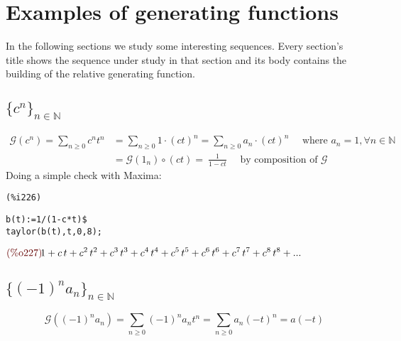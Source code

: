 
\section{Examples of generating functions}

In the following sections we study some interesting sequences. Every
section's title shows the sequence under study in that section and its
body contains the building of the relative generating function.

\subsection{$\{c^n\}_{n\in \mathbb{N} }$}
\begin{displaymath}
  \begin{split}
    \mathcal{G} (c^n) = \sum_{n \geq 0}{c^n t^n} &= \sum_{n \geq
      0}{1\cdot (ct)^n} = \sum_{n \geq 0}{a_n \cdot (ct)^n} \quad
    \text{ where } a_n = 1, \forall n \in \mathbb{N} \\
    &= \mathcal{G} (1_n) \circ (ct) = \ \frac{1}{1-ct} \quad \text{ by
    composition of } \mathcal{G} 
  \end{split}
\end{displaymath}
Doing a simple check with Maxima:

\noindent
\begin{minipage}[t]{8ex}{\color{red}\bf
\begin{verbatim}
(%i226) 
\end{verbatim}}
\end{minipage}
\begin{minipage}[t]{\textwidth}{\color{blue}
\begin{verbatim}
b(t):=1/(1-c*t)$
taylor(b(t),t,0,8);
\end{verbatim}}
\end{minipage}
\begin{math}\displaystyle
\parbox{8ex}{\color{labelcolor}(\%o227) }
1+c\,t+{c}^{2}\,{t}^{2}+{c}^{3}\,{t}^{3}+{c}^{4}\,{t}^{4}+{c}^{5}\,{t}^{5}+{c}^{6}\,{t}^{6}+{c}^{7}\,{t}^{7}+{c}^{8}\,{t}^{8}+...
\end{math}

\subsection{$\{(-1)^n a_n\}_{n\in \mathbb{N} }$}
\begin{displaymath}
    \mathcal{G} ((-1)^n a_n) = \sum_{n \geq 0}{(-1)^n a_n t^n} = \sum_{n \geq
      0}{a_n (-t)^n} = a(-t)
\end{displaymath}

